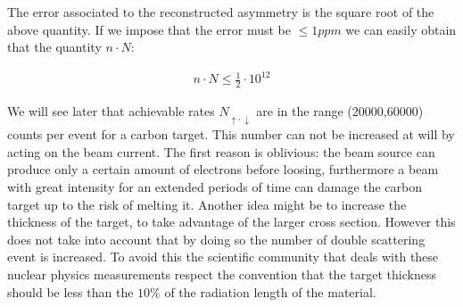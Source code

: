 The error associated to the reconstructed asymmetry is the square root of the above quantity. If we impose that the error must be $\le 1ppm$ we can easily obtain that the quantity $n\cdot N$:

\begin{align*}
n\cdot N \le \frac{1}{2} \cdot 10^{12}
\end{align*} 

We will see later that achievable rates $N_{\uparrow,\downarrow}$ are in the range (20000,60000) counts per event for a carbon target. This number can not be increased at will by acting on the beam current. The first reason is oblivious: the beam source can produce only a certain amount of electrons before loosing, furthermore a beam with great intensity for an extended periods of time can damage the carbon target up to the risk of melting it. 
Another idea might be to increase the thickness of the target, to take advantage of the larger cross section. However this does not take into account that by doing so the number of double scattering event is increased. To avoid this the scientific community that deals with these nuclear physics measurements respect the convention that the target thickness should be less than the $10 \%$ of the radiation length of the material.
